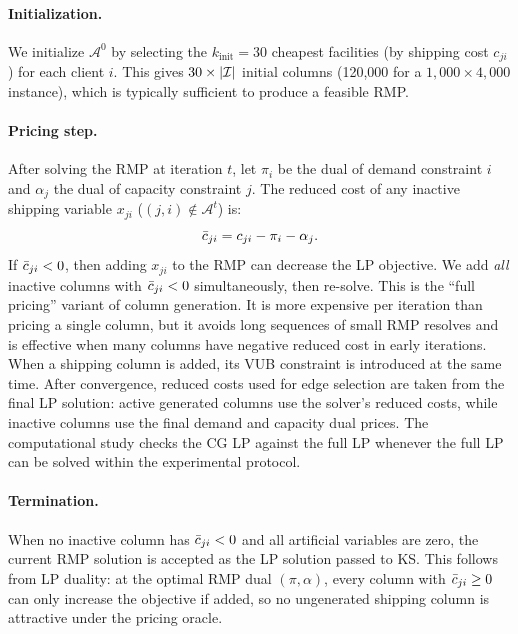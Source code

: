 \paragraph{Initialization.}
We initialize $\mathcal{A}^0$ by selecting the $k_{\text{init}} = 30$
cheapest facilities (by shipping cost $c_{ji}$) for each client $i$.
This gives $30 \times |\mathcal{I}|$ initial columns (120{,}000 for a
$1{,}000 \times 4{,}000$ instance), which is typically sufficient to produce
a feasible RMP.

\paragraph{Pricing step.}
After solving the RMP at iteration $t$, let $\pi_i$ be the dual of demand
constraint $i$ and $\alpha_j$ the dual of capacity constraint $j$.
The reduced cost of any inactive shipping variable $x_{ji}$
($(j,i) \notin \mathcal{A}^t$) is:
\begin{equation}
  \bar{c}_{ji} = c_{ji} - \pi_i - \alpha_j.
  \label{eq:pricing}
\end{equation}
If $\bar{c}_{ji} < 0$, then adding $x_{ji}$ to the RMP can decrease the LP
objective.
We add \emph{all} inactive columns with $\bar{c}_{ji} < 0$ simultaneously, then
re-solve.
This is the ``full pricing'' variant of column generation.
It is more expensive per iteration than pricing a single column, but it avoids
long sequences of small RMP resolves and is effective when many columns have
negative reduced cost in early iterations.
When a shipping column is added, its VUB constraint is introduced at the same
time.
After convergence, reduced costs used for edge selection are taken from the
final LP solution: active generated columns use the solver's reduced costs,
while inactive columns use the final demand and capacity dual prices.
The computational study checks the CG LP against the full LP whenever the full
LP can be solved within the experimental protocol.

\paragraph{Termination.}
When no inactive column has $\bar{c}_{ji} < 0$ and all artificial variables are zero,
the current RMP solution is accepted as the LP solution passed to KS.
This follows from LP duality: at the optimal RMP dual $(\pi, \alpha)$,
every column with $\bar{c}_{ji} \geq 0$ can only increase the objective if added,
so no ungenerated shipping column is attractive under the pricing oracle.

